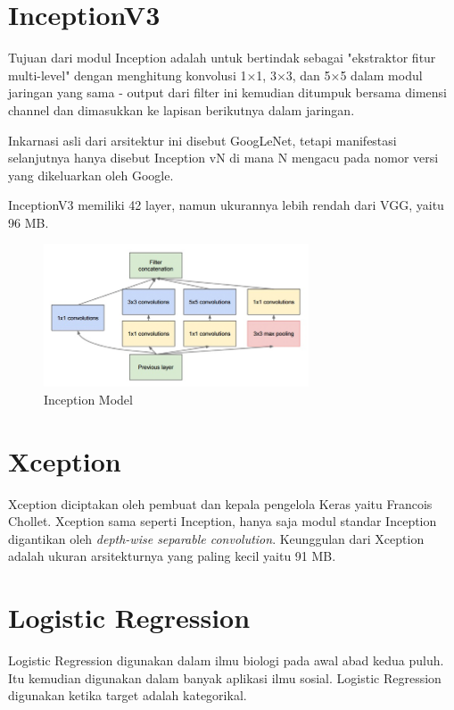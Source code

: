 \section{InceptionV3}
\par Tujuan dari modul Inception adalah untuk bertindak sebagai "ekstraktor fitur multi-level" dengan menghitung konvolusi 1×1, 3×3, dan 5×5 dalam modul jaringan yang sama - output dari filter ini kemudian ditumpuk bersama dimensi channel dan dimasukkan ke lapisan berikutnya dalam jaringan.

\par Inkarnasi asli dari arsitektur ini disebut GoogLeNet, tetapi manifestasi selanjutnya hanya disebut Inception vN di mana N mengacu pada nomor versi yang dikeluarkan oleh Google.

\par InceptionV3 memiliki 42 layer, namun ukurannya lebih rendah dari VGG, yaitu 96 MB.

\begin{figure}[!ht]
	\centering\includegraphics[width=0.7\textwidth]{bab2/figures/inception.png}
	\caption{Inception Model\cite{inception}}
	\label{fig:abstraksi1}
\end{figure}
\section{Xception}
\par Xception diciptakan oleh pembuat dan kepala pengelola Keras yaitu Francois Chollet. Xception sama seperti Inception, hanya saja modul standar Inception digantikan oleh \textit{depth-wise separable convolution}. Keunggulan dari Xception adalah ukuran arsitekturnya yang paling kecil yaitu 91 MB\cite{xception}.


\section{Logistic Regression}
\par Logistic Regression digunakan dalam ilmu biologi pada awal abad kedua puluh. Itu kemudian digunakan dalam banyak aplikasi ilmu sosial. Logistic Regression digunakan ketika target adalah kategorikal.

